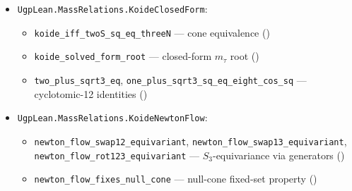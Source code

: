 \documentclass[11pt]{article}
\theoremstyle{remark}
\begin{document}
\begin{itemize}[leftmargin=1.3em,itemsep=0.1em]
  \item \nolinkurl{UgpLean.MassRelations.KoideClosedForm}:
    \begin{itemize}[leftmargin=1.3em,itemsep=0.05em]
      \item \nolinkurl{koide_iff_twoS_sq_eq_threeN} — cone equivalence ()
      \item \nolinkurl{koide_solved_form_root} — closed-form $m_\tau$ root ()
      \item \nolinkurl{two_plus_sqrt3_eq}, \nolinkurl{one_plus_sqrt3_sq_eq_eight_cos_sq} — cyclotomic-12 identities ()
    \end{itemize}
  \item \nolinkurl{UgpLean.MassRelations.KoideNewtonFlow}:
    \begin{itemize}[leftmargin=1.3em,itemsep=0.05em]
      \item \nolinkurl{newton_flow_swap12_equivariant}, \nolinkurl{newton_flow_swap13_equivariant}, \nolinkurl{newton_flow_rot123_equivariant} — $S_3$-equivariance via generators ()
      \item \nolinkurl{newton_flow_fixes_null_cone} — null-cone fixed-set property ()
    \end{itemize}
\end{itemize}
\end{document}
